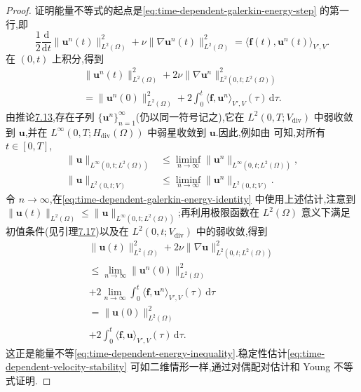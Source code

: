 \begin{lemma}[能量不等式与解的稳定性]
\begin{proof}
证明能量不等式的起点是\cref{eq:time-dependent-galerkin-energy-step} 的第一行,即
\[
  \frac{1}{2}\frac{\mathrm{d}}{\mathrm{d}t}
       \|\bm{u}^n(t)\|_{L^2(\Omega)}^2
  +\nu\|\nabla\bm{u}^n(t)\|_{L^2(\Omega)}^2
  =\langle\bm{f}(t),\bm{u}^n(t)\rangle_{V',V}.
\]
在 $(0,t)$ 上积分,得到
\begin{equation}\label{eq:time-dependent-galerkin-energy-identity}
\begin{gathered}
  \|\bm{u}^n(t)\|_{L^2(\Omega)}^2
  +2\nu\|\nabla\bm{u}^n\|_{L^2(0,t;L^2(\Omega))}^2\\
  =\|\bm{u}^n(0)\|_{L^2(\Omega)}^2
   +2\int_0^t\langle\bm{f},\bm{u}^n\rangle_{V',V}(\tau)
                       \,\mathrm{d}\tau.
\end{gathered}
\end{equation}
由推论\hyperref[cor:time-dependent-galerkin-weak-convergence]{7.13},存在子列 $\{\bm{u}^n\}_{n=1}^\infty$(仍以同一符号记之),它在 $L^2(0,T;V_{\mathrm{div}})$ 中弱收敛到 $\bm{u}$,并在 $L^\infty(0,T;H_{\mathrm{div}}(\Omega))$ 中弱星收敛到 $\bm{u}$.因此,例如由\textcite[第 723 页]{Evans2010} 可知,对所有 $t\in[0,T]$,
\[
\begin{aligned}
  \|\bm{u}\|_{L^\infty(0,t;L^2(\Omega))}
  &\le\liminf_{n\to\infty}
       \|\bm{u}^n\|_{L^\infty(0,t;L^2(\Omega))},\\
  \|\bm{u}\|_{L^2(0,t;V)}
  &\le\liminf_{n\to\infty}
       \|\bm{u}^n\|_{L^2(0,t;V)}.
\end{aligned}
\]
令 $n\to\infty$,在\cref{eq:time-dependent-galerkin-energy-identity} 中使用上述估计,注意到
$\|\bm{u}(t)\|_{L^2(\Omega)}\le\|\bm{u}\|_{L^\infty(0,t;L^2(\Omega))}$;再利用极限函数在 $L^2(\Omega)$ 意义下满足初值条件(见引理\hyperref[lem:time-dependent-initial-condition]{7.17})以及在 $L^2(0,t;V_{\mathrm{div}})$ 中的弱收敛,得到
\[
\begin{gathered}
  \|\bm{u}(t)\|_{L^2(\Omega)}^2
  +2\nu\|\nabla\bm{u}\|_{L^2(0,t;L^2(\Omega))}^2\\
  \le\lim_{n\to\infty}\|\bm{u}^n(0)\|_{L^2(\Omega)}^2\\
  +2\lim_{n\to\infty}\int_0^t
       \langle\bm{f},\bm{u}^n\rangle_{V',V}(\tau)\,\mathrm{d}\tau\\
  =\|\bm{u}(0)\|_{L^2(\Omega)}^2\\
  +2\int_0^t\langle\bm{f},\bm{u}\rangle_{V',V}(\tau)
                         \,\mathrm{d}\tau.
\end{gathered}
\]
这正是能量不等\cref{eq:time-dependent-energy-inequality}.稳定性估计\cref{eq:time-dependent-velocity-stability} 可如二维情形一样,通过对偶配对估计和 Young 不等式证明.
\end{proof}
\end{lemma}

